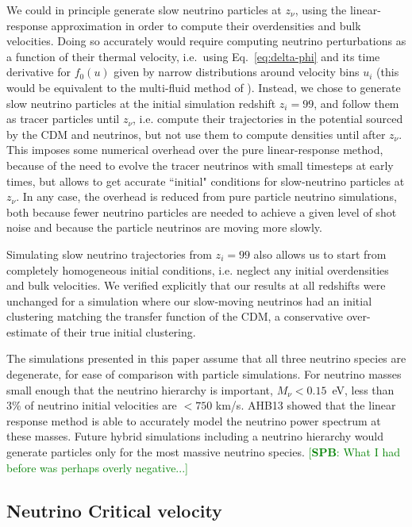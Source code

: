 \documentclass[useAMS, usenatbib]{mnras}
\newcommand{\spb}[1]{{\textcolor{green}{[{\bf SPB}: #1]}}}
\begin{document}
We could in principle generate slow neutrino particles at $z_\nu$, using the linear-response approximation in order to compute their overdensities and bulk velocities. Doing so accurately would require computing neutrino perturbations as a function of their thermal velocity, i.e.~using Eq.~\eqref{eq:delta-phi} and its time derivative for $f_0(u)$ given by narrow distributions around velocity bins $u_i$ (this would be equivalent to the multi-fluid method of \citealt{Dupuy_14}). Instead, we chose to generate slow neutrino particles at the initial simulation redshift $z_i = 99$, and follow them as tracer particles until $z_\nu$, i.e. compute their trajectories in the potential sourced by the CDM and neutrinos, but not use them to compute densities until after $z_\nu$. This imposes some numerical overhead over the pure linear-response method, because of the need to evolve the tracer neutrinos with small timesteps at early times, but allows to get accurate ``initial" conditions for slow-neutrino particles at $z_\nu$. In any case, the overhead is reduced from pure particle neutrino simulations, both because fewer neutrino particles are needed to achieve a given level of shot noise and because the particle neutrinos are moving more slowly.

Simulating slow neutrino trajectories from $z_i = 99$ also allows us to start from completely homogeneous initial conditions, i.e. neglect any initial overdensities and bulk velocities. We verified explicitly that our results at all redshifts were unchanged for a simulation where our slow-moving neutrinos had an initial clustering matching the transfer function of the CDM, a conservative over-estimate of their true initial clustering.

The simulations presented in this paper assume that all three neutrino species are degenerate, for ease of comparison with particle simulations. For neutrino masses small enough that the neutrino hierarchy is important, $M_\nu < 0.15$~eV, less than 3\% of neutrino initial velocities are $< 750$ km/s. AHB13 showed that the linear response method is able to accurately model the neutrino power spectrum at these masses. Future hybrid simulations including a neutrino hierarchy would generate particles only for the most massive neutrino species. \spb{What I had before was perhaps overly negative...}

\subsection{Neutrino Critical velocity}
\label{sec:critvel}
\end{document}
